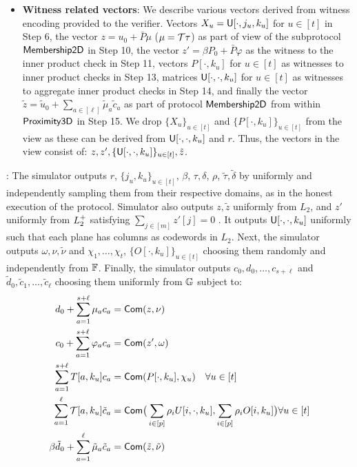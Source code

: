 \begin{itemize}
\item {\bf Witness related vectors}: We describe various vectors derived from
witness encoding provided to the verifier. Vectors $X_u=\mathsf{U}[\cdot,j_u,k_u]$
for $u\in [t]$ in Step 6, the vector $z=u_0 + \bar{P}\mu$ ($\mu=\mathcal{T}\tau$) as
part of view of the subprotocol $\mathsf{Membership2D}$ in Step 10, the vector
$z'=\beta P_0+\bar{P}\varphi$ as the witness to the inner product check in Step
11, vectors $P[\cdot,k_u]$ for $u\in [t]$ as witnesses to inner product checks
in Step 13, matrices $\mathsf{U}[\cdot,\cdot,k_u]$ for $u\in [t]$ as witnesses to
aggregate inner product checks in Step 14, and finally the vector
$\tilde{z}=\tilde{u}_0 + \sum_{a\in [\ell]}\tilde{\mu}_a\tilde{c}_a$ as part of
protocol $\mathsf{Membership2D}$ from within $\mathsf{Proximity3D}$ in Step 15. We drop
$\{X_u\}_{u\in [t]}$ and $\{P[\cdot,k_u]\}_{u\in [t]}$ from the view as these
can be derived from $\mathsf{U}[\cdot,\cdot,k_u]$ and $r$. Thus, the vectors in the
view consist of: $z,z',\{\mathsf{U}[\cdot,\cdot,k_u]\}_{u\in [t]},\tilde{z}$.
\end{itemize}

: The simulator outputs $r$, $\{j_u,k_u\}_{u\in [t]}$,
$\beta$, $\tau,\delta$, $\rho$, $\tilde{\tau},\tilde{\delta}$ by uniformly and
independently sampling them from their respective domains, as in the honest
execution of the protocol. Simulator also outputs $z,\tilde{z}$ uniformly from
$L_2$, and $z'$ uniformly from $L^{+}_2$ satisfying $\sum_{j\in [m]}z'[j]=0$ . It outputs
$\mathsf{U}[\cdot,\cdot,k_u]$ uniformly such that each plane has columns as codewords
in $L_2$. 
Next, the simulator outputs $\omega,\nu,\tilde{\nu}$
and $\chi_1,\ldots,\chi_t$, $\{O[\cdot,k_u]\}_{u\in [t]}$ choosing them randomly and
independently from $\mathbb{F}$. Finally, the simulator outputs
$c_0,d_0,\ldots,c_{s+\ell}$ and $\tilde{d}_0,\tilde{c}_1,\ldots,\tilde{c}_\ell$ choosing 
them uniformly from $\mathbb{G}$ subject to:
\begin{align}\label{eq:commiteq}
d_0 + \sum_{a=1}^{s+\ell}\mu_ac_a &= \mathsf{Com}(z,\nu) \nonumber \\
c_0 + \sum_{a=1}^{s+\ell}\varphi_ac_a &= \mathsf{Com}(z',\omega) \nonumber \\
\sum_{a=1}^{s+\ell}T[a,k_u]c_a &= \mathsf{Com}(P[\cdot,k_u],\chi_u) \quad \forall u\in
[t] \nonumber \\ 
\sum_{a=1}^{\ell}\mathcal{T}[a,k_u]\tilde{c}_a &= \mathsf{Com}\big(\sum_{i\in
[p]}\rho_i U[i,\cdot,k_u],\sum_{i\in [p]}\rho_i O[i,k_u]\big) \forall u\in [t]
\nonumber \\
\beta\tilde{d}_0 + \sum_{a=1}^{\ell}\tilde{\mu}_a\tilde{c}_a &=
\mathsf{Com}(\tilde{z},\tilde{\nu})
\end{align}

